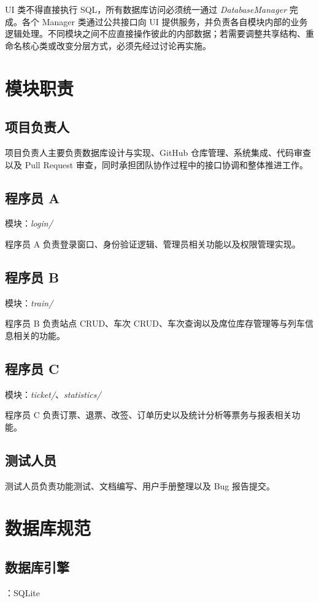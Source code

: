 \documentclass[10pt,twocolumn]{ctexart}
\begin{document}
UI 类不得直接执行 SQL，所有数据库访问必须统一通过 \textit{DatabaseManager} 完成。各个 Manager 类通过公共接口向 UI 提供服务，并负责各自模块内部的业务逻辑处理。不同模块之间不应直接操作彼此的内部数据；若需要调整共享结构、重命名核心类或改变分层方式，必须先经过讨论再实施。

\section{模块职责}
\subsection*{项目负责人}
项目负责人主要负责数据库设计与实现、GitHub 仓库管理、系统集成、代码审查以及 Pull Request 审查，同时承担团队协作过程中的接口协调和整体推进工作。

\subsection*{程序员 A}
模块：\textit{login/}

程序员 A 负责登录窗口、身份验证逻辑、管理员相关功能以及权限管理实现。

\subsection*{程序员 B}
模块：\textit{train/}

程序员 B 负责站点 CRUD、车次 CRUD、车次查询以及席位库存管理等与列车信息相关的功能。

\subsection*{程序员 C}
模块：\textit{ticket/}、\textit{statistics/}

程序员 C 负责订票、退票、改签、订单历史以及统计分析等票务与报表相关功能。

\subsection*{测试人员}
测试人员负责功能测试、文档编写、用户手册整理以及 Bug 报告提交。

\section{数据库规范}
\subsection*{数据库引擎}：SQLite
\end{document}
